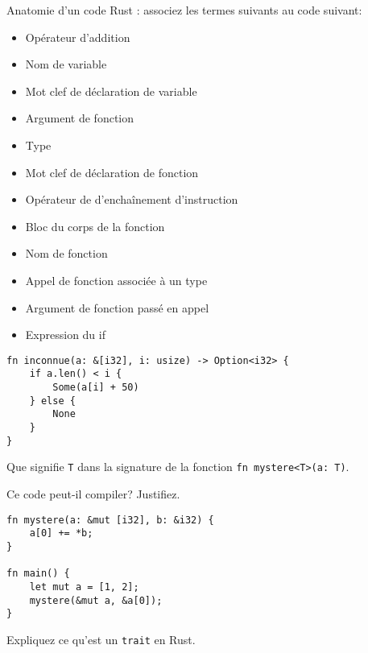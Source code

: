 \documentclass[11pt,a4paper,addpoint]{exam}
\begin{document}
\begin{questions}

\question[1] Anatomie d'un code Rust : associez les termes suivants au code suivant:
\begin{multicols}{2}
\begin{itemize}
    \item Opérateur d'addition
    \item Nom de variable
    \item Mot clef de déclaration de variable
    \item Argument de fonction
    \item Type
    \item Mot clef de déclaration de fonction
    \item Opérateur de d'enchaînement d'instruction
    \item Bloc du corps de la fonction
    \item Nom de fonction
    \item Appel de fonction associée à un type
    \item Argument de fonction passé en appel
    \item Expression du if
\end{itemize}
\end{multicols}
\begin{verbatim}
fn inconnue(a: &[i32], i: usize) -> Option<i32> {
    if a.len() < i {
        Some(a[i] + 50)
    } else {
        None
    }
}
\end{verbatim}
\vspace{2in}

\question[1] Que signifie \texttt{T} dans la signature de la fonction \texttt{fn mystere<T>(a: T)}.
\vspace{1in}

\question[1] Ce code peut-il compiler? Justifiez.
\begin{verbatim}
fn mystere(a: &mut [i32], b: &i32) {
    a[0] += *b;
}

fn main() {
    let mut a = [1, 2];
    mystere(&mut a, &a[0]);
}
\end{verbatim}
\vspace{1in}




\question[1] Expliquez ce qu'est un \texttt{trait} en Rust.
\vspace{1in}


\end{questions}
\end{document}

